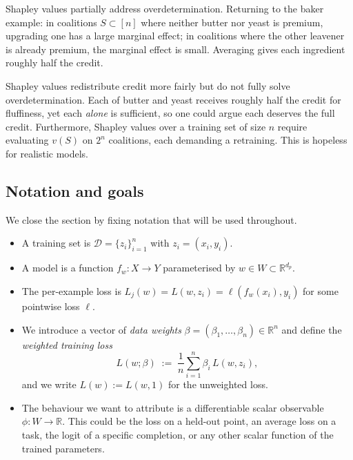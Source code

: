 \documentclass[11pt]{article}
\begin{document}
Shapley values partially address overdetermination. Returning to the baker example: in coalitions $S\subset [n]$ where neither butter nor yeast is premium, upgrading one has a large marginal effect; in coalitions where the other leavener is already premium, the marginal effect is small. Averaging gives each ingredient roughly half the credit.


\begin{remark}\label{rem:shapley-limit}
  Shapley values redistribute credit more fairly but do not fully solve overdetermination. Each of butter and yeast receives roughly half the credit for fluffiness, yet each \emph{alone} is sufficient, so one could argue each deserves the full credit. Furthermore, Shapley values over a training set of size $n$ require evaluating $v(S)$ on $2^n$ coalitions, each demanding a retraining. This is hopeless for realistic models. 
\end{remark}

\subsection{Notation and goals}\label{subsec:convention}

We close the section by fixing notation that will be used throughout.
\begin{itemize}
\item A training set is $\mathcal{D} = \{z_i\}_{i=1}^n$ with $z_i = (x_i, y_i)$.
\item A model is a function $f_w: X \to Y$ parameterised by $w \in W \subset \mathbb{R}^{d_p}$.
\item The per-example loss is $L_j(w)=L(w, z_i) = \ell(f_w(x_i), y_i)$ for some pointwise loss $\ell$. 
\item We introduce a vector of \emph{data weights} $\beta = (\beta_1, \ldots, \beta_n) \in \mathbb{R}^n$ and define the \emph{weighted training loss}
\[
  L(w; \beta) \;:=\; \frac{1}{n}\sum_{i=1}^n \beta_i\, L(w, z_i),
\]
and we write $L(w) := L(w, 1)$ for the unweighted loss.
\item The behaviour we want to attribute is a differentiable scalar observable $\phi: W \to \mathbb{R}$. This could be the loss on a held-out point, an average loss on a task, the logit of a specific completion, or any other scalar function of the trained parameters.  
\end{itemize}  
\end{document}
